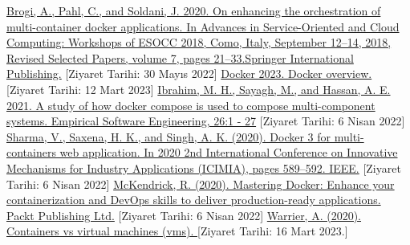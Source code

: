 \renewcommand{\refname}{KAYNAKLAR}

\begin{thebibliography}{99} %
\url{Brogi, A., Pahl, C., and Soldani, J. 2020. On enhancing the orchestration of multi-container docker applications. In Advances in Service-Oriented and Cloud Computing: Workshops of ESOCC 2018, Como, Italy, September 12–14, 2018, Revised Selected Papers, volume 7, pages 21–33.Springer International Publishing.} [Ziyaret Tarihi: 30 Mayıs 2022]
\url{Docker 2023. Docker overview.} [Ziyaret Tarihi: 12 Mart 2023]
\url{Ibrahim, M. H., Sayagh, M., and Hassan, A. E. 2021. A study of how docker compose is used to compose multi-component systems. Empirical Software Engineering, 26:1 - 27} [Ziyaret Tarihi: 6 Nisan 2022] 
\url{Sharma, V., Saxena, H. K., and Singh, A. K. (2020). Docker 3 for multi-containers web application. In 2020 2nd International Conference on Innovative Mechanisms for Industry Applications (ICIMIA), pages 589–592. IEEE.} [Ziyaret Tarihi: 6 Nisan 2022] 
\url{McKendrick, R. (2020). Mastering Docker: Enhance your containerization and DevOps skills to deliver production-ready applications. Packt Publishing Ltd.} [Ziyaret Tarihi: 6 Nisan 2022] 
\url{Warrier, A. (2020). Containers vs virtual machines (vms). } [Ziyaret Tarihi: 16 Mart 2023.] 
\end{thebibliography}
